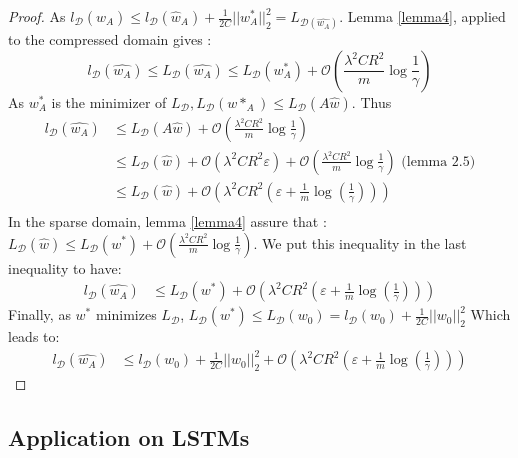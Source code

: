 \documentclass{article}
\begin{document}
\begin{proof} As 
$l_{\mathcal{D}}(\hat{w}_A) \leq l_{\mathcal{D}}(\hat{w}_A) 
+ \frac{1}{2C} ||w^*_A||_2^2 = L_{\mathcal{D}(\hat{w_A})}$.
Lemma \ref{lemma4}, applied to the compressed domain gives :
\[ l_\mathcal{D}(\hat{w_A}) \leq
    L_\mathcal{D}(\hat{w_A}) 
    \leq L_\mathcal{D}(w_A^*) 
    + \mathcal{O}\left (\frac{\lambda^2 C R^2}{m}\log \frac{1}{\gamma} \right )
\]
As $w^*_A$ is the minimizer of
 $L_{\mathcal{D}}, L_{\mathcal{D}}(w*_A) \leq L_{\mathcal{D}}(A\hat{w}) $.
Thus 
\begin{align*}
    l_\mathcal{D}(\hat{w_A}) 
    &\leq L_\mathcal{D}(A\hat{w}) 
    + \mathcal{O}\left (\frac{\lambda^2 C R^2}{m}\log \frac{1}{\gamma} \right ) \\
    &\leq L_\mathcal{D}(\hat{w}) + \mathcal{O}(\lambda^2 C R^2 \varepsilon)
    + \mathcal{O}\left (\frac{\lambda^2 C R^2}{m}\log \frac{1}{\gamma} \right ) 
    \text{    (lemma 2.5)}\\
    &\leq L_\mathcal{D}(\hat{w}) 
    + \mathcal{O}\left ( 
        \lambda^2CR^2 \left (
        \varepsilon + \frac{1}{m} \log(\frac{1}{\gamma})
        \right ) \right ) \\
\end{align*}
In the sparse domain, lemma \ref{lemma4} assure that : 
$L_{\mathcal{D}}(\hat{w}) \leq L_{\mathcal{D}}(w^*) + \mathcal{O}\left (\frac{\lambda^2 C R^2}{m}\log \frac{1}{\gamma} \right )
$.
We put this inequality in the last inequality to have:
\begin{align*}
    l_\mathcal{D}(\hat{w_A})    
    &\leq L_\mathcal{D}(w^*) 
    + \mathcal{O}\left ( 
        \lambda^2CR^2 \left (
        \varepsilon + \frac{1}{m} \log(\frac{1}{\gamma})
        \right ) \right )
\end{align*}
Finally, as $w^*$ minimizes $L_{\mathcal{D}}$, 
$L_{\mathcal{D}}(w^*) \leq L_{\mathcal{D}}(w_0) =
 l_{\mathcal{D}}(w_0) + \frac{1}{2C}||w_0||_2^2$
 Which leads to:
 \begin{align*}
    l_\mathcal{D}(\hat{w_A})    
    &\leq  l_{\mathcal{D}}(w_0) + \frac{1}{2C}||w_0||_2^2
    + \mathcal{O}\left ( 
        \lambda^2CR^2 \left (
        \varepsilon + \frac{1}{m} \log(\frac{1}{\gamma})
        \right ) \right )
 \end{align*}
\end{proof}


\subsection{Application on LSTMs}
\end{document}

